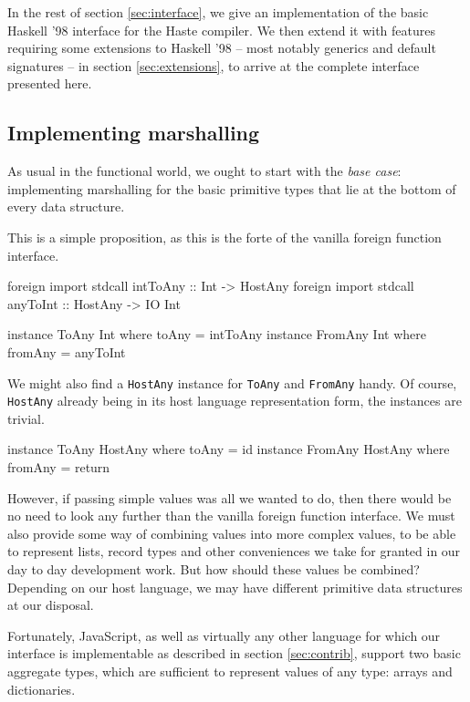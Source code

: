 \documentclass[preprint]{sigplanconf}
\begin{document}
In the rest of section \ref{sec:interface}, we give an implementation of the
basic Haskell '98 interface for the Haste compiler.
We then extend it with features requiring some extensions to Haskell '98 --
most notably generics and default signatures -- in section
\ref{sec:extensions}, to arrive at the complete interface presented here.

\subsection{Implementing marshalling}\label{sec:marshalling}
As usual in the functional world, we ought to start with the \emph{base case}:
implementing marshalling for the basic primitive types that lie at the bottom
of every data structure.

This is a simple proposition, as this is the forte of the vanilla foreign
function interface.

\begin{code}
foreign import stdcall intToAny :: Int -> HostAny
foreign import stdcall anyToInt :: HostAny -> IO Int

instance ToAny   Int where toAny   = intToAny
instance FromAny Int where fromAny = anyToInt
\end{code}

We might also find a \lstinline!HostAny! instance for \lstinline!ToAny!
and \lstinline!FromAny! handy. Of course, \lstinline!HostAny! already being
in its host language representation form, the instances are trivial.

\begin{code}
instance ToAny   HostAny where toAny   = id
instance FromAny HostAny where fromAny = return
\end{code}

However, if passing simple values was all we wanted to do, then there would be
no need to look any further than the vanilla foreign function interface.
We must also provide some way of combining values into more complex values,
to be able to represent lists, record types and other conveniences we take for
granted in our day to day development work.
But how should these values be combined? Depending on our host language, we
may have different primitive data structures at our disposal.

Fortunately, JavaScript, as well as virtually any other
language for which our interface is implementable as described in section
\ref{sec:contrib}, support two basic aggregate types, which are sufficient to
represent values of any type: arrays and dictionaries.
\end{document}
